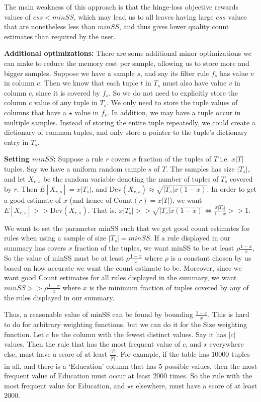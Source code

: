 \documentclass[10pt,journal,compsoc]{IEEEtran}
\newcommand{\stitle}[1]{\vspace{0.5em}\noindent\textbf{#1}}
\begin{document}
{The main weakness of this approach is that the hinge-loss objective rewards values of $ess < minSS$, which may lead us to all leaves having large $ess$ values that are nonetheless less than $minSS$, and thus gives lower quality count estimates than required by the user.


\stitle{Additional optimizations:}
There are some additional minor optimizations we can make to reduce the memory cost per sample, allowing us to store more and bigger samples. 
Suppose we have a sample $s$, and say its filter rule $f_s$ has value $v$ in column $c$. Then we know that each tuple $t$ in $T_s$ must also have value $v$ in column $c$, since it is covered by $f_s$. So we do not need to explicitly store the column $c$ value of any tuple in $T_s$. We only need to store the tuple values of columns that have a $\star$ value in $f_s$.
In addition, we may have a tuple occur in multiple samples. Instead of storing the entire tuple repeatedly, we could create a dictionary of common tuples, and only store a pointer to the tuple's dictionary entry in $T_s$. 


\stitle{Setting $minSS$:}
Suppose a rule $r$ covers $x$ fraction of the tuples of $T$ i.e. $x|T|$ tuples. Say we have a uniform random sample $s$ of $T$. The samples has size $|T_s|$, and let $X_{r,s}$ be the random variable denoting the number of tuples of $T_s$ covered by $r$. Then $E\left[ X_{r,s} \right] = x|T_s|$, and $\text{Dev}(X_{r,s}) \approx \sqrt{|T_s|x(1-x)}$. In order to get a good estimate of $x$ (and hence of Count$(r) = x|T|$), we want $E\left[X_{r,s}\right] >> \text{Dev}(X_{r,s})$. That is, $x|T_s| >> \sqrt{|T_s|x(1-x)} \Leftrightarrow \frac{x|T_s|}{1-x} >> 1$. 

We want to set the parameter minSS such that we get good count estimates for rules when using a sample of size $|T_s| = minSS$. If a rule displayed in our summary has covers $x$ fraction of the tuples, we want minSS to be at least $\rho\frac{1-x}{x}$, So the value of minSS must be at least $\rho\frac{1-x}{x}$ where $\rho$ is a constant chosen by us based on how accurate we want the count estimate to be. Moreover, since we want good Count estimates for all rules displayed in the summary, we want $minSS >> \rho\frac{1-x}{x}$ where $x$ is the minimum fraction of tuples covered by any of the rules displayed in our summary.

Thus, a reasonable value of minSS can be found by bounding $\frac{1-x}{x}$. This is hard to do for arbitrary weighting functions, but we can do it for the Size weighting function. Let $c$ be the column with the fewest distinct values. Say it has $|c|$ values. Then the rule that has the most frequent value of $c$, and $\star$ everywhere else, must have a score of at least $\frac{|T|}{|c|}$. For example, if the table has $10000$ tuples in all, and there is a `Education' column that has 5 possible values, then the most frequent value of Education must occur at least $2000$ times. So the rule with the most frequent value for Education, and $\star$s elsewhere, must have a score of at least $2000$. 

}
\end{document}
